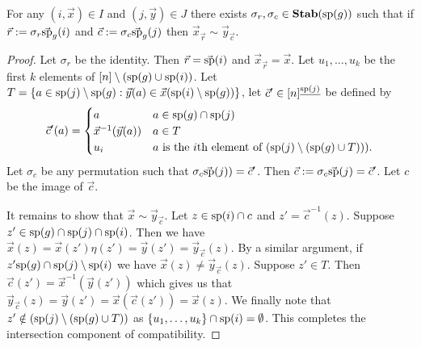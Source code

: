\documentclass[../paper.tex]{subfiles}
\begin{document}
\begin{lem}
	\label{lem:permutation-row-column}
	For any $(i, \vec{x}) \in I$ and $(j, \vec{y}) \in J$ there exists $\sigma_r,
	\sigma_c \in \text{\textbf{Stab}} (\text{sp} (g))$ such that if $\vec{r} := \sigma_r \vec{\text{sp}}_g(i)$
	and $\vec{c} := \sigma_c \vec{\text{sp}}_g(j)$ then $\vec{x}_{\vec{r}} \sim
	\vec{y}_{\vec{c}}$.
\end{lem}
\begin{proof}
	Let $\sigma_r$ be the identity. Then $\vec{r} = \vec{\text{sp}}(i)$ and
	$\vec{x}_{\vec{r}} = \vec{x}$. Let $u_1, \ldots , u_k$ be the first $k$
	elements of $[n] \setminus (\text{sp}(g) \cup \text{sp}(i))$. Let $T = \{a \in
	\text{sp}(j) \setminus \text{sp}(g) : \vec{y}(a) \in \vec{x}(\text{sp}(i) \setminus
	\text{sp}(g))\}$, let $\vec{c}' \in [n]^{\underline{\text{sp}(j)}}$ be defined by
	\[
		\vec{c}' (a) =
		\begin{cases}
			a                        & a \in \text{sp}(g) \cap \text{sp}(j)                                     \\
			\vec{x}^{-1}(\vec{y}(a)) & a \in T                                                            \\
			u_{i}                    & \text{$a$ is the $i$th element of $(\text{sp}(j) \setminus (\text{sp}(g) 
			\cup T)))$}.
		\end{cases}
	\]
	Let $\sigma_c$ be any permutation such that $\sigma_c \vec{\text{sp}}(j)) =
	\vec{c}'$. Then $\vec{c} := \sigma_c \vec{\text{sp}}(j) = \vec{c}'$. Let $c$ be
	the image of $\vec{c}$.
		
	It remains to show that $\vec{x} \sim \vec{y}_{\vec{c}}$. Let $z \in \text{sp}(i)
	\cap c$ and $z' = \vec{c}^{-1}(z)$. Suppose $z' \in \text{sp}(g)\cap \text{sp}(j)
	\cap \text{sp}(i)$. Then we have $\vec{x}(z) = \vec{x}(z') \eta (z') =
	\vec{y}(z') = \vec{y}_{\vec{c}}(z)$. By a similar argument, if $z' \text{sp}(g)
	\cap \text{sp}(j) \setminus \text{sp}(i)$ we have $\vec{x}(z) \neq
	\vec{y}_{\vec{c}}(z)$. Suppose $z' \in T$. Then $\vec{c}(z') =
	\vec{x}^{-1}(\vec{y}(z'))$ which gives us that $\vec{y}_{\vec{c}}(z) =
	\vec{y}(z') = \vec{x}(\vec{c}(z')) = \vec{x}(z)$. We finally note that $z'
	\notin (\text{sp}(j) \setminus (\text{sp}(g) \cup T))$ as $\{u_1 , \ldots , u_k\}
	\cap \text{sp}(i) = \emptyset$. This completes the intersection component of
	compatibility.
		

\end{proof}
\end{document}
